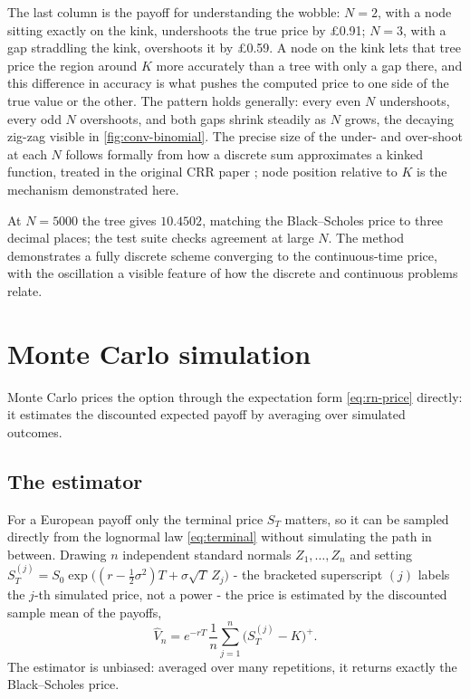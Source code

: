 \documentclass[11pt,a4paper]{article}
\numberwithin{equation}{section}
\theoremstyle{definition}
\theoremstyle{plain}
\theoremstyle{remark}
\begin{document}
The last column is the payoff for understanding the wobble: $N=2$, with a node
sitting exactly on the kink, undershoots the true price by £0.91; $N=3$, with
a gap straddling the kink, overshoots it by £0.59. A node on the kink
lets that tree price the region around $K$ more accurately than a tree with
only a gap there, and this difference in accuracy is what pushes the computed
price to one side of the true value or the other. The pattern holds generally:
every even $N$ undershoots, every odd $N$ overshoots, and both gaps shrink
steadily as $N$ grows, the decaying zig-zag visible in \cref{fig:conv-binomial}.
The precise size of the under- and over-shoot at each $N$ follows formally
from how a discrete sum approximates a kinked function, treated in the original
CRR paper \cite{crr}; node position relative to $K$ is
the mechanism demonstrated here.

At $N = 5000$ the tree gives $10.4502$, matching the Black--Scholes price to three
decimal places; the test suite checks agreement at large $N$. The method
demonstrates a fully discrete scheme converging to the continuous-time price, with
the oscillation a visible feature of how the discrete and continuous problems
relate.

\clearpage
\section{Monte Carlo simulation}\label{sec:montecarlo}

Monte Carlo prices the option through the expectation form \eqref{eq:rn-price}
directly: it estimates the discounted expected payoff by averaging over simulated
outcomes.

\subsection{The estimator}

For a European payoff only the terminal price $S_T$ matters, so it can be sampled
directly from the lognormal law \eqref{eq:terminal} without simulating the path in
between. Drawing $n$ independent standard normals $Z_1,\dots,Z_n$ and setting
$S_T^{(j)} = S_0 \exp\!\big((r-\tfrac{1}{2}\sigma^2)T + \sigma\sqrt{T}\,Z_j\big)$ -
the bracketed superscript $(j)$ labels the $j$-th simulated price, not a power -
the price is estimated by the discounted sample mean of the payoffs,
\begin{equation}\label{eq:mc-est}
  \widehat{V}_n = e^{-rT}\,\frac{1}{n}\sum_{j=1}^{n} \big(S_T^{(j)} - K\big)^{+}.
\end{equation}
The estimator is unbiased: averaged over many repetitions, it returns exactly
the Black--Scholes price.
\end{document}
